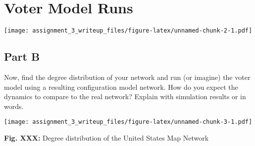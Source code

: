 \documentclass[]{article}
\begin{document}
\hypertarget{voter-model-runs}{%
\section{Voter Model Runs}\label{voter-model-runs}}

\texttt{[image: assignment\_3\_writeup\_files/figure-latex/unnamed-chunk-2-1.pdf]}

\hypertarget{part-b-1}{%
\subsection{Part B}\label{part-b-1}}

Now, find the degree distribution of your network and run (or imagine)
the voter model using a resulting configuration model network. How do
you expect the dynamics to compare to the real network? Explain with
simulation results or in words.

\texttt{[image: assignment\_3\_writeup\_files/figure-latex/unnamed-chunk-3-1.pdf]}

\textbf{Fig. XXX:} Degree distribution of the United States Map Network
\end{document}
